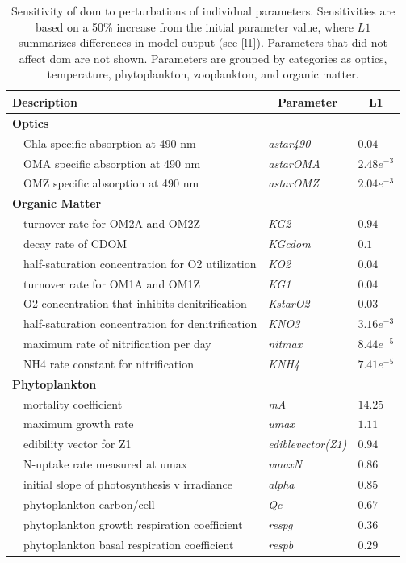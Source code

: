 \documentclass[review]{elsarticle}\usepackage[]{graphicx}\usepackage[]{color}
\begin{document}
\begin{table}[!tbp]
{\footnotesize
\caption{Sensitivity of \acl{dom} to perturbations of individual parameters.  Sensitivities are based on a 50\% increase from the initial parameter value, where $L1$ summarizes differences in model output (see \cref{l1}).  Parameters that did not affect \acl{dom} are not shown.  Parameters are grouped by categories as optics, temperature, phytoplankton, zooplankton, and organic matter.\label{tab:om2sens}} 
\begin{center}
\begin{tabular}{lll}
\hline\hline
\multicolumn{1}{l}{Description}&\multicolumn{1}{c}{Parameter}&\multicolumn{1}{c}{L1}\tabularnewline
\hline
{\bfseries Optics}&&\tabularnewline
~~Chla specific absorption at 490 nm&\textit{astar490}&$0.04$\tabularnewline
~~OMA specific absorption at 490 nm&\textit{astarOMA}&$2.48e^{-3}$\tabularnewline
~~OMZ specific absorption at 490 nm&\textit{astarOMZ}&$2.04e^{-3}$\tabularnewline
\hline
{\bfseries Organic Matter}&&\tabularnewline
~~turnover rate for OM2A and OM2Z&\textit{KG2}&$0.94$\tabularnewline
~~decay rate of CDOM&\textit{KGcdom}&$0.1$\tabularnewline
~~half-saturation concentration for O2 utilization&\textit{KO2}&$0.04$\tabularnewline
~~turnover rate for OM1A and OM1Z&\textit{KG1}&$0.04$\tabularnewline
~~O2 concentration that inhibits denitrification&\textit{KstarO2}&$0.03$\tabularnewline
~~half-saturation concentration for denitrification&\textit{KNO3}&$3.16e^{-3}$\tabularnewline
~~maximum rate of nitrification per day&\textit{nitmax}&$8.44e^{-5}$\tabularnewline
~~NH4 rate constant for nitrification&\textit{KNH4}&$7.41e^{-5}$\tabularnewline
\hline
{\bfseries Phytoplankton}&&\tabularnewline
~~mortality coefficient&\textit{mA}&$14.25$\tabularnewline
~~maximum growth rate&\textit{umax}&$1.11$\tabularnewline
~~edibility vector for Z1&\textit{ediblevector(Z1)}&$0.94$\tabularnewline
~~N-uptake rate measured at umax&\textit{vmaxN}&$0.86$\tabularnewline
~~initial slope of photosynthesis v irradiance&\textit{alpha}&$0.85$\tabularnewline
~~phytoplankton carbon/cell&\textit{Qc}&$0.67$\tabularnewline
~~phytoplankton growth respiration coefficient&\textit{respg}&$0.36$\tabularnewline
~~phytoplankton basal respiration coefficient&\textit{respb}&$0.29$\tabularnewline

\end{tabular}
\end{center}}
\end{table}
\end{document}
